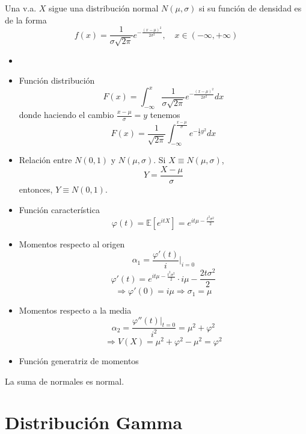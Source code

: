 \begin{defn}
  Una v.a. $X$ sigue una distribución normal $N(\mu, \sigma)$ si su función de densidad es de la forma
  \[ 
    f(x) = \frac{1}{\sigma \sqrt{2 \pi}} e^{- \frac{(x -\mu)^{2}}{2 \sigma^{2}}}, \quad x \in (-\infty, + \infty)
  \] 
\end{defn}

\begin{prop}
  \begin{itemize}
    \item []
    \item Función distribución
      \[ 
        F(x) = \int_{-\infty}^{x} \frac{1}{\sigma \sqrt{2 \pi}} e^{-\frac{(x -\mu)^{2}}{2 \sigma^{2}}} dx
      \] 
      donde haciendo el cambio $\frac{x - \mu}{\sigma} = y$ tenemos
      \[ 
        F(x) = \frac{1}{\sqrt{2 \pi}} \int_{- \infty}^{\frac{x - \mu}{\sigma}} e^{-\frac{1}{2}y^{2}} dx
      \] 
    \item Relación entre $N(0,1)$ y $N(\mu, \sigma)$. Si $X \equiv N(\mu, \sigma)$,
      \[ 
        Y = \frac{X - \mu}{\sigma}
      \] 
      entonces, $Y \equiv N(0, 1)$.
    \item Función característica
      \[ 
        \varphi(t) =\mathbb{E} [ e^{itX} ] = e^{it \mu - \frac{t^{2}\sigma^{2}}{2}}
      \] 
    \item Momentos respecto al origen
      \[ 
        \alpha_{1} = \frac{\varphi'(t)}{i} \Big|_{i = 0}^{} 
      \] 
      \[ 
        \varphi'(t) = e^{it \mu - \frac{t^{2} \sigma^{2}}{2}} \cdot i \mu - \frac{2t \sigma^{2}}{2} 
      \] 
      \[ 
        \Rightarrow \varphi'(0) = i \mu  \Rightarrow \sigma_{1} = \mu
      \] 
    \item Momentos respecto a la media
      \[ 
        \alpha_{2} = \frac{\varphi''(t)|_{t = 0}}{i^{2}} = \mu^{2} + \varphi^{2}
      \] 
      \[ 
        \Rightarrow V(X) = \mu^{2} + \varphi^{2} - \mu^{2} = \varphi^{2} 
      \] 
    \item Función generatriz de momentos
  \end{itemize}
\end{prop}

\begin{theo}
  La suma de normales es normal.
\end{theo}

\section{Distribución Gamma}

